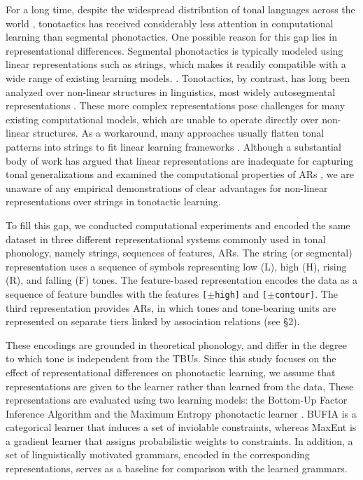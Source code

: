 For a long time, despite the widespread distribution of tonal
languages across the world \citep{yip2002tone}, tonotactics
has received considerably less attention in computational
learning than segmental phonotactics. One possible reason
for this gap lies in representational differences.
Segmental phonotactics is typically modeled using linear
representations such as strings, which makes it readily
compatible with a wide range of existing learning models.
 \citep{CP97, hayes2008maximum,goldsmith2012information,
 mayer2020phonotactic,schrimpf2014comparing}.
Tonotactics, by contrast, has long been analyzed over
non-linear structures in linguistics, most widely autosegmental
representations \citep[ARs,][]{goldsmith1976autosegmental}.
These more complex representations pose challenges for many
existing computational models, which are unable to operate
directly over non-linear structures. As a workaround, many
approaches usually flatten tonal patterns into strings to
fit linear learning frameworks \citep{shih2013subsegmental}.
Although a substantial body of work has argued that linear
representations are inadequate for capturing tonal
generalizations \citep{clements2010autosegmental,
        oddenintroducing2013} and examined the computational
properties of ARs \citep{bird1990phonological,
        coleman1991no,kornai2007mathematical,
        jardine2015concatenation,jardine2016locality,
        jardine2017LocalNature,jardine2019expressivity},
we are unaware of any empirical demonstrations of clear
advantages for non-linear representations over strings in
tonotactic learning.

To fill this gap, we conducted computational experiments
and encoded the same dataset in three different representational 
systems commonly used in tonal phonology, %
namely strings, sequences of features, ARs.
The string (or segmental) representation uses a sequence of
symbols representing low (L), high (H), rising (R), and
falling (F) tones. The feature-based representation encodes 
the data as a sequence of feature bundles with the features 
\texttt{[\(\pm\)high]} and \texttt{[\(\pm\)contour]}. The third 
representation provides ARs, in which tones and tone-bearing units are 
represented on separate tiers linked by association relations (see \S2). 

These encodings are grounded in theoretical phonology, 
and differ in the degree to which tone is independent 
from the TBUs. Since this study focuses on the effect of 
representational differences on phonotactic learning, we 
assume that representations are given to the learner 
rather than learned from the data, These representations are 
evaluated using two learning models: the Bottom-Up Factor Inference
Algorithm \citep[BUFIA;][]{chandleeBufia2019} and the
Maximum Entropy phonotactic learner \citep[MaxEnt;][]{hayes2008maximum}.
BUFIA is a categorical learner that induces a set of
inviolable constraints, whereas MaxEnt is a gradient
learner that assigns probabilistic weights to constraints.
In addition, a set of linguistically motivated grammars,
encoded in the corresponding representations, serves as
a baseline for comparison with the learned grammars.

